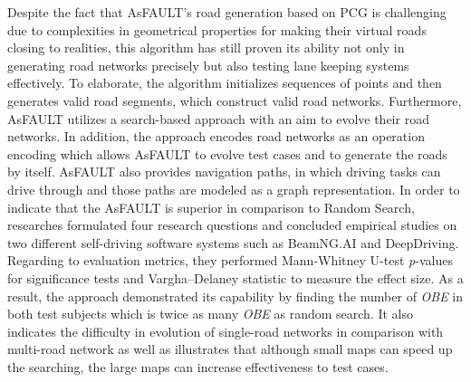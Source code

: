 \documentclass[10pt,a4paper]{report}
\begin{document}
Despite the fact that AsFAULT's road generation based on PCG is challenging due to complexities in geometrical properties for making their virtual roads closing to realities, 
this algorithm has still proven its ability not only in generating road networks precisely but also testing lane keeping systems effectively.
%
To elaborate, the algorithm initializes sequences of points and then generates valid road segments, which construct valid road networks.
%
Furthermore, AsFAULT utilizes a search-based approach with an aim to evolve their road networks.
%
In addition, the approach encodes road networks as an operation encoding which allows AsFAULT to evolve test cases and to generate the roads by itself. 
%
AsFAULT also provides navigation paths, in which driving tasks can drive through and those paths are modeled as a graph representation.
%
In order to indicate that the AsFAULT is superior in comparison to Random Search, researches formulated four research questions and concluded empirical studies on two different self-driving software systems such as BeamNG.AI and DeepDriving.
%
Regarding to evaluation metrics, they performed Mann-Whitney U-test \textit{p}-values for significance tests and Vargha–Delaney statistic to measure the effect size.
%
As a result, the approach demonstrated its capability by finding the number of \textit{OBE} in both test subjects which is twice as many \textit{OBE} as random search. It also indicates the difficulty in evolution of single-road networks in comparison with multi-road network as well as illustrates that although small maps can speed up the searching, the large maps can increase effectiveness to test cases.
\end{document}
